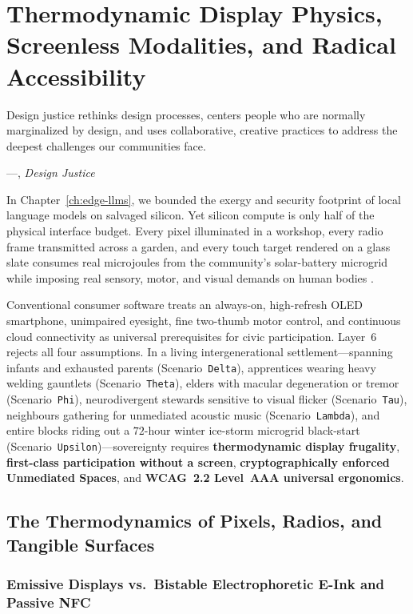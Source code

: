 \chapter{Thermodynamic Display Physics, Screenless Modalities, and Radical Accessibility}
\label{ch:thermodynamic-accessibility}

\epigraph{Design justice rethinks design processes, centers people who are normally marginalized by design, and uses collaborative, creative practices to address the deepest challenges our communities face.}{---\textcite{costanzachock2020design}, \textit{Design Justice}}

In Chapter~\ref{ch:edge-llms}, we bounded the exergy and security footprint of local language models on salvaged silicon. Yet silicon compute is only half of the physical interface budget. Every pixel illuminated in a workshop, every radio frame transmitted across a garden, and every touch target rendered on a glass slate consumes real microjoules from the community's solar-battery microgrid while imposing real sensory, motor, and visual demands on human bodies \parencite{georgescu1971,fitts1954information,w3c2023wcag}.

Conventional consumer software treats an always-on, high-refresh OLED smartphone, unimpaired eyesight, fine two-thumb motor control, and continuous cloud connectivity as universal prerequisites for civic participation. Layer~6 rejects all four assumptions. In a living intergenerational settlement---spanning infants and exhausted parents (Scenario~\texttt{Delta}), apprentices wearing heavy welding gauntlets (Scenario~\texttt{Theta}), elders with macular degeneration or tremor (Scenario~\texttt{Phi}), neurodivergent stewards sensitive to visual flicker (Scenario~\texttt{Tau}), neighbours gathering for unmediated acoustic music (Scenario~\texttt{Lambda}), and entire blocks riding out a $72$-hour winter ice-storm microgrid black-start (Scenario~\texttt{Upsilon})---sovereignty requires \textbf{thermodynamic display frugality}, \textbf{first-class participation without a screen}, \textbf{cryptographically enforced Unmediated Spaces}, and \textbf{WCAG~2.2 Level~AAA universal ergonomics}.

\section{The Thermodynamics of Pixels, Radios, and Tangible Surfaces}
\label{sec:display-thermodynamics}

\subsection{Emissive Displays vs.\ Bistable Electrophoretic E-Ink and Passive NFC}

